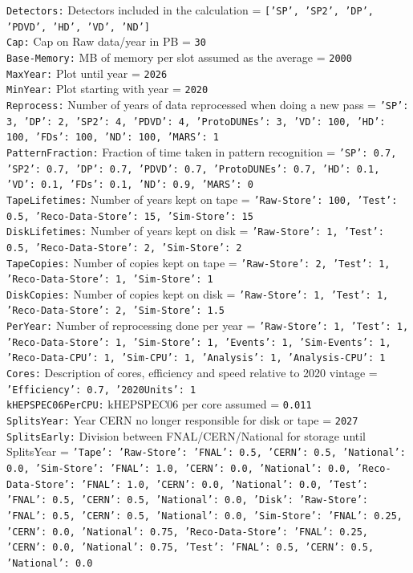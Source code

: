 {\tt Detectors:} Detectors included in the calculation = {\tt ['SP', 'SP2', 'DP', 'PDVD', 'HD', 'VD', 'ND']} \\
{\tt Cap:} Cap on Raw data/year in PB = {\tt 30} \\
{\tt Base-Memory:} MB of memory per slot assumed as the average = {\tt 2000} \\
{\tt MaxYear:} Plot until year = {\tt 2026} \\
{\tt MinYear:} Plot starting with year = {\tt 2020} \\
{\tt Reprocess:} Number of years of data reprocessed when doing a new pass = {\tt {'SP': 3, 'DP': 2, 'SP2': 4, 'PDVD': 4, 'ProtoDUNEs': 3, 'VD': 100, 'HD': 100, 'FDs': 100, 'ND': 100, 'MARS': 1}} \\
{\tt PatternFraction:} Fraction of time taken in pattern recognition = {\tt {'SP': 0.7, 'SP2': 0.7, 'DP': 0.7, 'PDVD': 0.7, 'ProtoDUNEs': 0.7, 'HD': 0.1, 'VD': 0.1, 'FDs': 0.1, 'ND': 0.9, 'MARS': 0}} \\
{\tt TapeLifetimes:} Number of years kept on tape = {\tt {'Raw-Store': 100, 'Test': 0.5, 'Reco-Data-Store': 15, 'Sim-Store': 15}} \\
{\tt DiskLifetimes:} Number of years kept on disk = {\tt {'Raw-Store': 1, 'Test': 0.5, 'Reco-Data-Store': 2, 'Sim-Store': 2}} \\
{\tt TapeCopies:} Number of copies kept on tape = {\tt {'Raw-Store': 2, 'Test': 1, 'Reco-Data-Store': 1, 'Sim-Store': 1}} \\
{\tt DiskCopies:} Number of copies kept on disk = {\tt {'Raw-Store': 1, 'Test': 1, 'Reco-Data-Store': 2, 'Sim-Store': 1.5}} \\
{\tt PerYear:} Number of reprocessing done per year = {\tt {'Raw-Store': 1, 'Test': 1, 'Reco-Data-Store': 1, 'Sim-Store': 1, 'Events': 1, 'Sim-Events': 1, 'Reco-Data-CPU': 1, 'Sim-CPU': 1, 'Analysis': 1, 'Analysis-CPU': 1}} \\
{\tt Cores:} Description of cores, efficiency and speed relative to 2020 vintage = {\tt {'Efficiency': 0.7, '2020Units': 1}} \\
{\tt kHEPSPEC06PerCPU:} kHEPSPEC06 per core assumed = {\tt 0.011} \\
{\tt SplitsYear:} Year CERN no longer responsible for disk or tape = {\tt 2027} \\
{\tt SplitsEarly:} Division between FNAL/CERN/National for storage until SplitsYear = {\tt {'Tape': {'Raw-Store': {'FNAL': 0.5, 'CERN': 0.5, 'National': 0.0}, 'Sim-Store': {'FNAL': 1.0, 'CERN': 0.0, 'National': 0.0}, 'Reco-Data-Store': {'FNAL': 1.0, 'CERN': 0.0, 'National': 0.0}, 'Test': {'FNAL': 0.5, 'CERN': 0.5, 'National': 0.0}}, 'Disk': {'Raw-Store': {'FNAL': 0.5, 'CERN': 0.5, 'National': 0.0}, 'Sim-Store': {'FNAL': 0.25, 'CERN': 0.0, 'National': 0.75}, 'Reco-Data-Store': {'FNAL': 0.25, 'CERN': 0.0, 'National': 0.75}, 'Test': {'FNAL': 0.5, 'CERN': 0.5, 'National': 0.0}}}} \\
